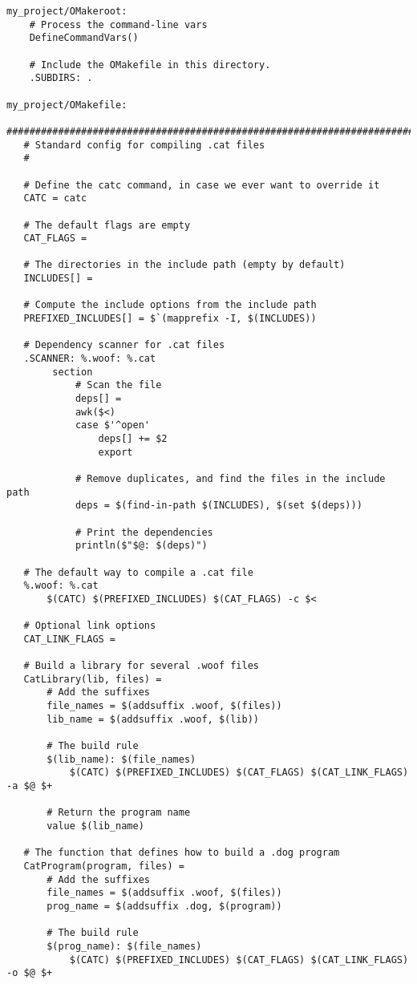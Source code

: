 \begin{verbatim}
my_project/OMakeroot:
    # Process the command-line vars
    DefineCommandVars()
    
    # Include the OMakefile in this directory.
    .SUBDIRS: .

my_project/OMakefile:
   ########################################################################
   # Standard config for compiling .cat files
   #

   # Define the catc command, in case we ever want to override it
   CATC = catc

   # The default flags are empty
   CAT_FLAGS =
   
   # The directories in the include path (empty by default)
   INCLUDES[] =

   # Compute the include options from the include path
   PREFIXED_INCLUDES[] = $`(mapprefix -I, $(INCLUDES))

   # Dependency scanner for .cat files
   .SCANNER: %.woof: %.cat
        section
            # Scan the file
            deps[] =
            awk($<)
            case $'^open'
                deps[] += $2
                export

            # Remove duplicates, and find the files in the include path
            deps = $(find-in-path $(INCLUDES), $(set $(deps)))

            # Print the dependencies
            println($"$@: $(deps)")

   # The default way to compile a .cat file
   %.woof: %.cat
       $(CATC) $(PREFIXED_INCLUDES) $(CAT_FLAGS) -c $<

   # Optional link options
   CAT_LINK_FLAGS =

   # Build a library for several .woof files
   CatLibrary(lib, files) =
       # Add the suffixes
       file_names = $(addsuffix .woof, $(files))
       lib_name = $(addsuffix .woof, $(lib))

       # The build rule
       $(lib_name): $(file_names)
           $(CATC) $(PREFIXED_INCLUDES) $(CAT_FLAGS) $(CAT_LINK_FLAGS) -a $@ $+

       # Return the program name
       value $(lib_name)

   # The function that defines how to build a .dog program
   CatProgram(program, files) =
       # Add the suffixes
       file_names = $(addsuffix .woof, $(files))
       prog_name = $(addsuffix .dog, $(program))

       # The build rule
       $(prog_name): $(file_names)
           $(CATC) $(PREFIXED_INCLUDES) $(CAT_FLAGS) $(CAT_LINK_FLAGS) -o $@ $+


\end{verbatim}
